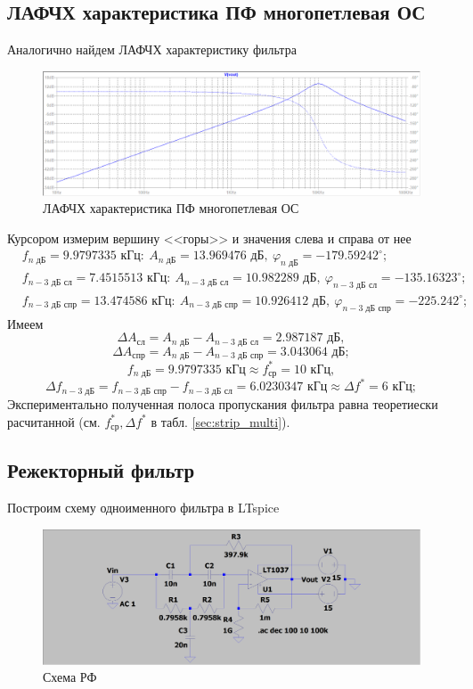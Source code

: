 \documentclass[a4paper, 12pt]{article}
\begin{document}
    \subsection{ЛАФЧХ характеристика ПФ многопетлевая ОС}
    Аналогично найдем ЛАФЧХ характеристику фильтра
    \begin{figure}[H]
        \centering
        \includegraphics[scale=0.46]{4task_lapfr.png}
        \captionsetup{skip=0pt}
        \caption{ЛАФЧХ характеристика ПФ многопетлевая ОС}
        \label{fig:4task_lapfr}
    \end{figure}
    \noindent Курсором измерим вершину <<горы>> и значения слева и справа от нее
    \begin{align*}
    &f_{n\text{ дБ}}=9.9797335\text{ кГц}:\ A_{n\text{ дБ}}=13.969476\text{ дБ},\ \varphi_{n\text{ дБ}}=-179.59242^{\circ};\\
    &f_{n-3\text{ дБ сл}}=7.4515513 \text{ кГц}:\ A_{n-3\text{ дБ сл}}=10.982289\text{ дБ},\ \varphi_{n-3\text{ дБ сл}}=-135.16323^{\circ};\\
    &f_{n-3\text{ дБ спр}}=13.474586 \text{ кГц}:\ A_{n-3\text{ дБ спр}}=10.926412\text{ дБ},\ \varphi_{n-3\text{ дБ спр}}=-225.242^{\circ};
    \end{align*}
    Имеем
    $$
    \Delta A_\text{сл}=A_{n\text{ дБ}}-A_{n-3\text{ дБ сл}}=2.987187\text{ дБ},
    $$
    $$
    \Delta A_\text{спр}=A_{n\text{ дБ}}-A_{n-3\text{ дБ спр}}=3.043064\text{ дБ};
    $$
    $$
    f_{n\text{ дБ}}=9.9797335\text{ кГц}\approx f_\text{ср}^*=10\text{ кГц},
    $$
    $$
    \Delta f_{n-3\text{ дБ}}=f_{n-3\text{ дБ спр}}-f_{n-3\text{ дБ сл}}=6.0230347\text{ кГц}\approx \Delta f^*=6\text{ кГц};
    $$
    Экспериментально полученная полоса пропускания фильтра равна теоретиески расчитанной (см. $f_\text{ср}^*,\Delta f^*$ в табл. \ref{sec:strip_multi}).


    \subsection{Режекторный фильтр}
    Построим схему одноименного фильтра в LTspice
    \begin{figure}[H]
        \centering
        \includegraphics[scale=0.22]{scheme5.png}
        \captionsetup{skip=0pt}
        \caption{Схема РФ}
        \label{fig:scheme5}
    \end{figure}
\end{document}
